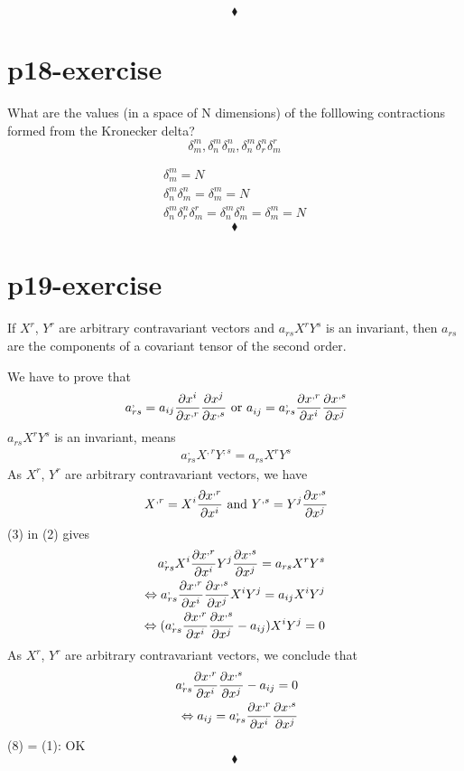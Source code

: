 $$\blacklozenge$$
\pagebreak[4]

\section{p18-exercise}

\begin{tcolorbox}
What are the values (in a space of N dimensions) of the folllowing contractions formed from the Kronecker delta?
$$\delta^{m}_{m},  \delta^{m}_{n} \delta^{n}_{m},  \delta^{m}_{n} \delta^{n}_{r} \delta^{r}_{m}$$
\end{tcolorbox}
\begin{align}
\delta^{m}_{m} = N\\
\delta^{m}_{n} \delta^{n}_{m} = \delta^{m}_{m} = N\\
\delta^{m}_{n} \delta^{n}_{r} \delta^{r}_{m} = \delta^{m}_{n} \delta^{n}_{m} = \delta^{m}_{m} = N
\end{align}
$$\blacklozenge$$
\pagebreak[4]

\section{p19-exercise}
\begin{tcolorbox}
If $X^{r}$, $Y^{r}$ are arbitrary contravariant vectors and $a_{rs}X^{r}Y^{s}$ is an invariant, then $a_{rs}$ are the components of a covariant tensor of the second order. 
\end{tcolorbox}
We have to prove that
\begin{align}
\ a^{,}_{rs} = a_{ij}\pdv{x^{i}}{x^{,r}}\pdv{x^{j}}{x^{,s}} \text{ or } a^{}_{ij} = a^{,}_{rs}\pdv{x^{,r}}{x^{i}}\pdv{x^{,s}}{x^{j}}
\end{align}
$a_{rs}X^{r}Y^{s}$ is an invariant, means
\begin{align}
\ a^{,}_{rs}X^{,r}Y^{,s} = a_{rs}X^{r}Y^{s}
\end{align}
As $X^{r}$, $Y^{r}$ are arbitrary contravariant vectors, we have
\begin{align}
\ X^{,r} = X^{i}\pdv{x^{,r}}{x^{i}} \text{   and  } Y^{,s} = Y^{j}\pdv{x^{,s}}{x^{j}}
\end{align}
(3) in (2) gives
\begin{align}
\ a^{,}_{rs}X^{i}\pdv{x^{,r}}{x^{i}}Y^{j}\pdv{x^{,s}}{x^{j}} = a_{rs}X^{r}Y^{s}\\
\Leftrightarrow a^{,}_{rs}\pdv{x^{,r}}{x^{i}}\pdv{x^{,s}}{x^{j}}X^{i}Y^{j} = a_{ij}X^{i}Y^{j}\\
\Leftrightarrow (a^{,}_{rs}\pdv{x^{,r}}{x^{i}}\pdv{x^{,s}}{x^{j}} - a_{ij})X^{i}Y^{j} = 0
\end{align}
As $X^{r}$, $Y^{r}$ are arbitrary contravariant vectors, we conclude that 
\begin{align}
\ a^{,}_{rs}\pdv{x^{,r}}{x^{i}}\pdv{x^{,s}}{x^{j}} - a_{ij} = 0\\
\Leftrightarrow a_{ij} =  a^{,}_{rs}\pdv{x^{,r}}{x^{i}}\pdv{x^{,s}} {x^{j}}
\end{align}
(8) = (1): OK
$$\blacklozenge$$
\pagebreak[4]

